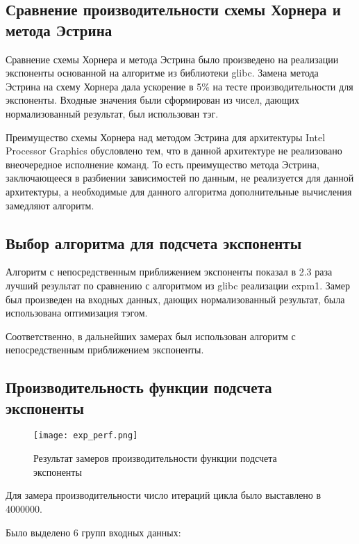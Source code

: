 \subsection{Сравнение производительности схемы Хорнера и метода Эстрина}

Сравнение схемы Хорнера и метода Эстрина было произведено на реализации экспоненты основанной на алгоритме из библиотеки glibc.
Замена метода Эстрина на схему Хорнера дала ускорение в 5\% на тесте производительности для экспоненты.
Входные значения были сформирован из чисел, дающих нормализованный результат, был использован тэг.

Преимущество схемы Хорнера над методом Эстрина для архитектуры \foreignlanguage{english}{Intel Processor Graphics} обусловлено тем, что в данной архитектуре не реализовано внеочередное исполнение команд.
То есть преимущество метода Эстрина, заключающееся в разбиении зависимостей по данным, не реализуется для данной архитектуры, а необходимые для данного алгоритма дополнительные вычисления замедляют алгоритм.

\subsection{Выбор алгоритма для подсчета экспоненты}

Алгоритм с непосредственным приближением экспоненты показал в 2.3 раза лучший результат по сравнению с алгоритмом из glibc реализации expm1.
Замер был произведен на входных данных, дающих нормализованный результат, была использована оптимизация тэгом.

Соответственно, в дальнейших замерах был использован алгоритм с непосредственным приближением экспоненты.

\subsection{Производительность функции подсчета экспоненты}

\begin{figure}[hbt]
    \centering
    \texttt{[image: exp\_perf.png]}
    \caption{Результат замеров производительности функции подсчета экспоненты}
    \label{hist:exp:perf}
\end{figure}

Для замера производительности число итераций цикла было выставлено в 4000000.

Было выделено 6 групп входных данных:

